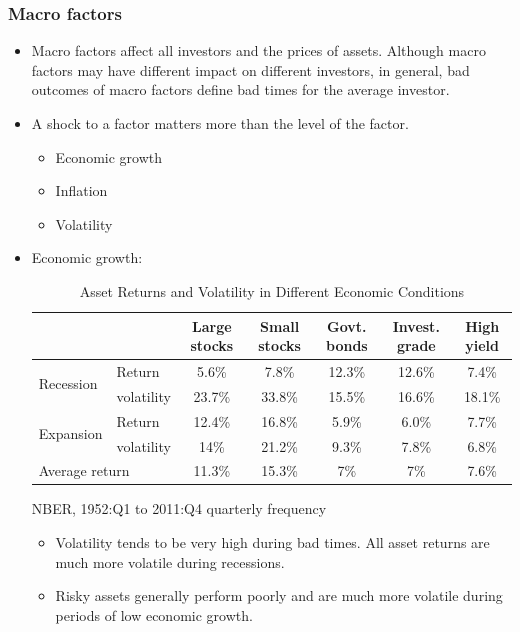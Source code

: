 \subsubsection{Macro factors}
\begin{itemize}
\item Macro factors affect all investors and the prices of assets. Although macro factors may have different impact on different investors, in general, bad outcomes of macro factors define bad times for the average investor.
\item A shock to a factor matters more than the level of the factor.
    \begin{itemize}
    \item Economic growth
    
    \item Inflation
    \item Volatility
    \end{itemize}
\item Economic growth:


\begin{table}[htbp]
    \centering
    \caption{Asset Returns and Volatility in Different Economic Conditions}
    \begin{tabular}{l l c c c c c}
        \toprule
        &  & Large stocks & Small stocks & Govt. bonds & Invest. grade & High yield \\
        \midrule
        \multirow{2}{*}{Recession} 
        & Return & 5.6\% & 7.8\% & 12.3\% & 12.6\% & 7.4\% \\
        & volatility & 23.7\% & 33.8\% & 15.5\% & 16.6\% & 18.1\% \\
        \midrule
        \multirow{2}{*}{Expansion} 
        & Return & 12.4\% & 16.8\% & 5.9\% & 6.0\% & 7.7\% \\
        & volatility & 14\% & 21.2\% & 9.3\% & 7.8\% & 6.8\% \\
        \midrule
        \multicolumn{2}{l}{Average return} & 11.3\% & 15.3\% & 7\% & 7\% & 7.6\% \\
        \bottomrule
    \end{tabular}

    \footnotesize{NBER, 1952:Q1 to 2011:Q4 quarterly frequency}
\end{table}
    \begin{itemize}
    \item Volatility tends to be very high during bad times. All asset returns are much more volatile during recessions.
    \item Risky assets generally perform poorly and are much more volatile during periods of low economic growth.
    \end{itemize}



\end{itemize}
